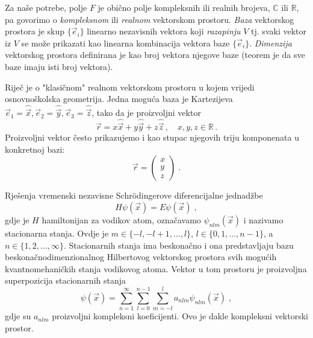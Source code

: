 Za naše potrebe, polje $F$ je obično polje kompleksnih ili 
realnih brojeva, $\mathbb{C}$ ili $\mathbb{R}$, pa govorimo o
 \emph{kompleksnom} ili \emph{realnom} vektorskom prostoru.
\emph{Baza} vektorskog prostora je skup $\{\vec{e}_{i}\}$ linearno nezavisnih vektora koji 
\emph{razapinju} $V$ tj. svaki vektor iz $V$ se može prikazati kao linearna
kombinacija vektora baze $\{\vec{e}_{i}\}$.
\emph{Dimenzija} vektorskog prostora definirana je kao broj vektora njegove baze (teorem
je da sve baze imaju isti broj vektora). 

\begin{primjer} 
Riječ je o "klasičnom" realnom vektorskom prostoru u kojem vrijedi osnovnoškolska
geometrija. Jedna moguća baza je Kartezijeva
$\vec{e}_{1}=\hat{\vec{x}}, \vec{e}_{2}=\hat{\vec{y}}, 
   \vec{e}_{3}=\hat{\vec{z}}$, tako da je proizvoljni vektor
\begin{equation}
    \vec{r} = x \hat{\vec{x}} + y \hat{\vec{y}} + z \hat{\vec{z}} \,,
    \quad x, y, z \in \mathbb{R} \,.
\end{equation}
Proizvoljni vektor često prikazujemo i kao stupac njegovih triju komponenata
u konkretnoj bazi:
\begin{equation}
\vec{r}= \left(
\begin{array}{c}
x \\
y \\
z
\end{array} \right) \;.
\end{equation}
\end{primjer}

\begin{primjer}
     
Rješenja vremenski nezavisne Schr\"{o}dingerove diferencijalne jednadžbe 
\begin{equation}
H\psi(\vec{x})=E\psi(\vec{x}) \;,
\end{equation}
gdje je $H$ hamiltonijan za vodikov atom, označavamo 
$\psi_{nlm}(\vec{x})$ i nazivamo stacionarna stanja. Ovdje je
$m \in \{-l, -l+1, \ldots, l\}$, $l \in \{0, 1, \ldots, n-1\}$,
a $n \in \{1, 2, \ldots, \infty\}$. Stacionarnih stanja ima
beskonačno i ona predstavljaju
bazu beskonačnodimenzionalnog Hilbertovog vektorskog prostora
svih mogućih kvantnomehaničkih stanja vodikovog atoma.
Vektor u tom prostoru je proizvoljna superpozicija stacionarnih
stanja
\begin{equation}
       \psi(\vec{x})=\sum_{n=1}^{\infty}\sum_{l=0}^{n-1}
  \sum_{m=-l}^{l}  a_{nlm}  \psi_{nlm}(\vec{x}) \;,
\end{equation}
gdje su $a_{nlm}$ proizvoljni kompleksni koeficijenti. Ovo je dakle
kompleksni vektorski prostor.

\end{primjer}

